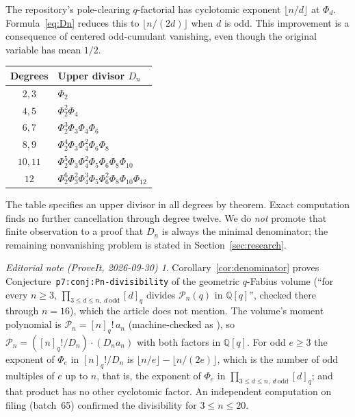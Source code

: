\documentclass[11pt,a4paper]{article}
\numberwithin{equation}{section}
\theoremstyle{definition}
\theoremstyle{remark}
\newtheorem*{ednote}{Editorial note (ProveIt, 2026-09-30)}
\newcommand{\Q}{\mathbb Q}
\begin{document}
The repository's pole-clearing \(q\)-factorial has cyclotomic exponent \(\lfloor n/d\rfloor\) at \(\Phi_d\). Formula~\eqref{eq:Dn} reduces this to \(\lfloor n/(2d)\rfloor\) when \(d\) is odd. This improvement is a consequence of centered odd-cumulant vanishing, even though the original variable has mean \(1/2\).

\begin{center}
\begin{tabular}{cl}
\toprule
Degrees & Upper divisor \(D_n\) \\
\midrule
\(2,3\) & \(\Phi_2\) \\
\(4,5\) & \(\Phi_2^2\Phi_4\) \\
\(6,7\) & \(\Phi_2^3\Phi_3\Phi_4\Phi_6\) \\
\(8,9\) & \(\Phi_2^4\Phi_3\Phi_4^2\Phi_6\Phi_8\) \\
\(10,11\) & \(\Phi_2^5\Phi_3\Phi_4^2\Phi_5\Phi_6\Phi_8\Phi_{10}\) \\
\(12\) & \(\Phi_2^6\Phi_3^2\Phi_4^3\Phi_5\Phi_6^2\Phi_8\Phi_{10}\Phi_{12}\) \\
\bottomrule
\end{tabular}
\end{center}

The table specifies an upper divisor in all degrees by theorem. Exact computation finds no further cancellation through degree twelve. We do \emph{not} promote that finite observation to a proof that \(D_n\) is always the minimal denominator; the remaining nonvanishing problem is stated in Section~\ref{sec:research}.
\begin{ednote}
Corollary~\ref{cor:denominator} proves
Conjecture~\texttt{p7:conj:Pn-divisibility} of the geometric $q$-Fabius
volume  (``for every $n\ge3$,
$\prod_{3\le d\le n,\ d\ \mathrm{odd}}[d]_q$ divides $\mathcal P_n(q)$ in
$\Q[q]$'', checked there through $n=16$), which the article does not
mention. The volume's moment polynomial is
$\mathcal P_n=[n]_q!\,a_n$ (machine-checked as
), so
$\mathcal P_n=([n]_q!/D_n)\cdot(D_na_n)$ with both factors in $\Q[q]$. For
odd $e\ge3$ the exponent of $\Phi_e$ in $[n]_q!/D_n$ is
$\lfloor n/e\rfloor-\lfloor n/(2e)\rfloor$, which is the number of odd
multiples of $e$ up to $n$, that is, the exponent of $\Phi_e$ in
$\prod_{3\le d\le n,\ d\ \mathrm{odd}}[d]_q$; and that product has no other
cyclotomic factor. An independent computation on filing (batch~65)
confirmed the divisibility for $3\le n\le20$.
\end{ednote}
\end{document}
